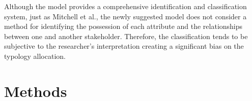 \documentclass[authoryear,preprint,review,12pt]{elsarticle}
\begin{document}
    Although the model provides a comprehensive identification and classification system, just as Mitchell et al., the newly suggested model does not consider a method for identifying the possession of each attribute and the relationships between one and another stakeholder. Therefore, the classification tends to be subjective to the researcher's interpretation creating a significant bias on the typology allocation.
    \section{Methods} \label{sec:Methods}
\end{document}
